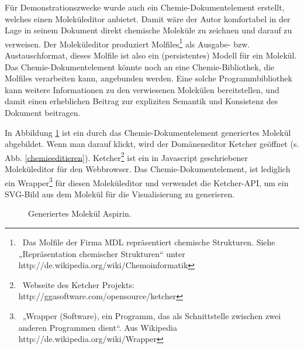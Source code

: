 Für Demonstrationszwecke wurde auch ein Chemie-Dokumentelement erstellt, welches einen Moleküleditor anbietet. Damit wäre der Autor komfortabel in der Lage in seinem Dokument direkt chemische Moleküle zu zeichnen und darauf zu verweisen. Der Moleküleditor produziert Molfiles\footnote{~Das Molfile der Firma MDL repräsentiert chemische Strukturen. Siehe „Repräsentation chemischer Strukturen“ unter http://de.wikipedia.org/wiki/Chemoinformatik } als Ausgabe- bzw. Austauschformat, dieses Molfile ist also ein (persistentes) Modell für ein Molekül. Das Chemie-Dokumentelement könnte noch an eine Chemie-Bibliothek, die Molfiles verarbeiten kann, angebunden werden. Eine solche Programmbibliothek kann weitere Informationen zu den verwiesenen Molekülen bereitstellen, und damit einen erheblichen Beitrag zur expliziten Semantik und Konsistenz des Dokument beitragen.

 
In Abbildung \ref{Aspirin} ist ein durch das Chemie-Dokumentelement generiertes Molekül abgebildet. Wenn man darauf klickt, wird der Domäneneditor Ketcher geöffnet (s. Abb. \ref{chemieeditieren}). Ketcher\footnote{~Webseite des Ketcher Projekts: http://ggasoftware.com/opensource/ketcher} ist ein in Javascript geschriebener Moleküleditor für den Webbrowser. Das Chemie-Dokumentelement, ist lediglich ein Wrapper\footnote{~„Wrapper (Software), ein Programm, das als Schnittstelle zwischen zwei anderen Programmen dient“. Aus Wikipedia http://de.wikipedia.org/wiki/Wrapper} für diesen Moleküleditor und verwendet die Ketcher-API, um ein SVG-Bild aus dem Molekül für die Visualisierung zu generieren.

 
\begin{figure}[h!]
\centering
\advance\leftskip-2.5cm
\caption{ Generiertes Molekül Aspirin. }\label{Aspirin}
\end{figure}
 

